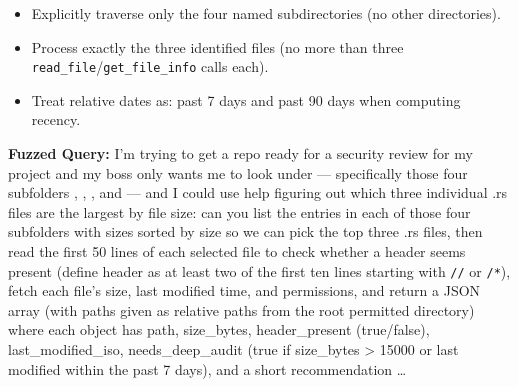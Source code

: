 \begin{ColorBlock}
\begin{itemize}
  \item Explicitly traverse only the four named subdirectories (no other directories).
  \item Process exactly the three identified files (no more than three \texttt{read\_file}/\texttt{get\_file\_info} calls each).
  \item Treat relative dates as: past 7 days and past 90 days when computing recency.
\end{itemize}

\textbf{Fuzzed Query: }%
I'm trying to get a repo ready for a security review for my project and my boss only wants me to look under  — specifically those four subfolders , , , and  — and I could use help figuring out which three individual .rs files are the largest by file size: can you list the entries in each of those four subfolders with sizes sorted by size so we can pick the top three .rs files, then read the first 50 lines of each selected file to check whether a header seems present (define header as at least two of the first ten lines starting with \texttt{//} or \texttt{/*}), fetch each file's size, last modified time, and permissions, and return a JSON array (with paths given as relative paths from the root permitted directory) where each object has path, size\_bytes, header\_present (true/false), last\_modified\_iso, needs\_deep\_audit (true if size\_bytes > 15000 or last modified within the past 7 days), and a short recommendation …

\end{ColorBlock}


